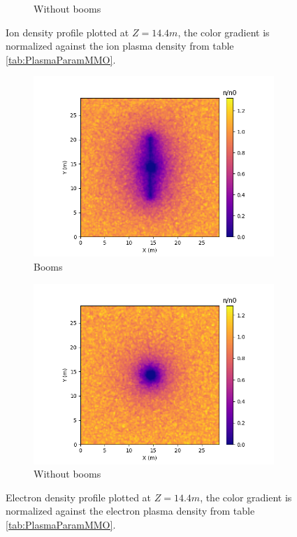 \begin{center}
\begin{figure}[H]
\begin{subfigure}[b]{0.61\textwidth}
      \caption{Without booms}
      \label{fig:I_noPH_NB}
    \end{subfigure}
  \caption{Ion density profile plotted at $Z = 14.4 m$, the color gradient is normalized against the ion plasma density from table \ref{tab:PlasmaParamMMO}.}
\label{fig:IonsNoPH}
  \end{figure}
\end{center}

\begin{center}
    \begin{figure}[H]
      \begin{subfigure}[b]{0.61\textwidth}
      \includegraphics[width=\textwidth]{figures/MMO/noPH/WB/E_noPH_WB.png}
      \caption{Booms}
      \label{fig:E_noPH_WB}
    \end{subfigure}
    \begin{subfigure}[b]{0.61\textwidth}
      \includegraphics[width=\textwidth]{figures/MMO/noPH/NB/E_noPH_NB.png}
      \caption{Without booms}
      \label{fig:E_noPH_NB}
    \end{subfigure}
  \caption{Electron density profile plotted at $Z = 14.4 m$, the color gradient is normalized against the electron plasma density from table \ref{tab:PlasmaParamMMO}.}
  \label{fig:ElectronsNoPH}
  \end{figure}
\end{center}

